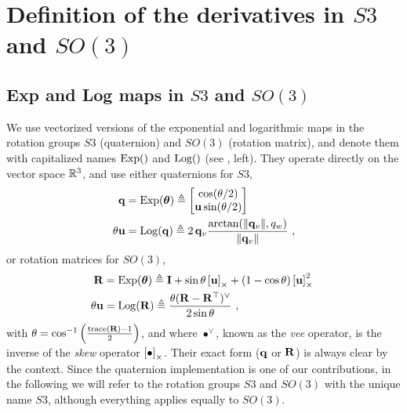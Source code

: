 
\appendices


\small

\section{Definition of the derivatives in $S3$ and $SO(3)$}
\label{sec:derivatives_SO3}


\subsection{Exp and Log maps in $S3$ and $SO(3)$}

We use vectorized versions of the exponential and logarithmic maps in the rotation groups $S3$ (quaternion) and $SO(3)$ (rotation matrix), and denote them with capitalized names $\operatorname*{Exp}()$ and $\operatorname*{Log}()$ (see , left). They operate directly on the vector space ${\mathbb R}^3$, and use either quaternions for $S3$,%
%
\begin{subequations}
\begin{align}
{\bf q}
&= \operatorname*{Exp}({{\bm \theta}}) \triangleq \begin{bmatrix}
\cos(\theta/2) \\ {\bf u}\sin(\theta/2)
\end{bmatrix}\\ 
\theta{\bf u} &= \operatorname*{Log}({\bf q}) \triangleq 2\,{{\bf q}_v}\frac{\arctan({{\left\|{{\bf q}_v}\right\|},q_w})}{{\left\|{{\bf q}_v}\right\|}}
~,
\end{align}
\end{subequations}
%
or rotation matrices for $SO(3)$, 
%
\begin{subequations}
\begin{align}
{\bf R}
&= \operatorname*{Exp}({{\bm \theta}}) \triangleq {\bf I} + \sin\theta\left[{\bf u}\right]_\times + (1-\cos\theta)\left[{\bf u}\right]_\times^2~ \label{equ:rodrigues} \\ 
\theta{\bf u} &= \operatorname*{Log}({\bf R}) \triangleq \frac{\theta({\bf R}-{\bf R}^{\top})^\vee}{2\sin\theta} 
~,
\end{align}
\end{subequations}
%
with $\theta=\cos^{-1}\left(\frac{\operatorname*{trace}({\bf R})-1}{2}\right)$,
and where $\bullet^\vee$, known as the \emph{vee} operator, is the inverse of the \emph{skew} operator $\left[\bullet\right]_\times$. 
Their exact form (${\bf q}$ or ${\bf R}$) is always clear by the context.
Since the quaternion implementation is one of our contributions, in the following we will refer to the rotation groups $S3$ and $SO(3)$ with the unique name $S3$, although everything applies equally to $SO(3)$. 

